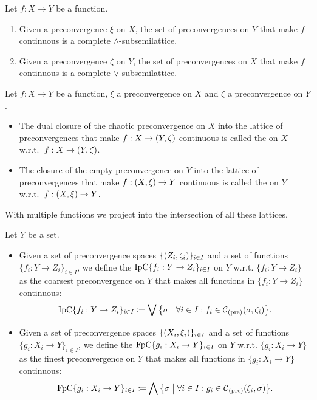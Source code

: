 \begin{corollary}
Let $f: X\to Y$ be a function.
\begin{enumerate}
\item Given a preconvergence $\xi$ on $X$, the set of preconvergences on $Y$ that make $f$ continuous is a complete $\wedge$-subsemilattice.
\item Given a preconvergence $\zeta$ on $Y$, the set of preconvergences on $X$ that make $f$ continuous is a complete $\vee$-subsemilattice.
\end{enumerate}
\end{corollary}

\begin{definition}
Let $f: X\to Y$ be a function, $\xi$ a preconvergence on $X$ and $\zeta$ a preconvergence on $Y$.
\begin{itemize}
\item The dual closure of the chaotic preconvergence on $X$ into the lattice of preconvergences that make $f:X\to \sSet{Y,\zeta}$ continuous is called the  on $X$ w.r.t.\ $f:X\to \sSet{Y,\zeta}$.
\item The closure of the empty preconvergence on $Y$ into the lattice of preconvergences that make $f:\sSet{X,\xi}\to Y$ continuous is called the  on $Y$ w.r.t.\ $f:\sSet{X,\xi}\to Y$.
\end{itemize}
\end{definition}

With multiple functions we project into the intersection of all these lattices.

\begin{definition}
Let $Y$ be a set.
\begin{itemize}
\item Given a set of preconvergence spaces $\{\sSet{Z_i,\zeta_i}\}_{i\in I}$ and a set of functions $\{f_i: Y\to Z_i\}_{i\in I}$, we define the  $\operatorname{IpC}\{f_i: Y\to Z_i\}_{i\in I}$ on $Y$ w.r.t. $\{f_i: Y\to Z_i\}$ as the coarsest preconvergence on $Y$ that makes all functions in $\{f_i: Y\to Z_i\}$ continuous:
\[ \initialPreConv\{f_i: Y\to Z_i\}_{i\in I} \defeq \bigvee \setbuilder{\sigma}{\forall i\in I: f_i\in  \cont_\text{(pre)}(\sigma, \zeta_i)}. \]
\item Given a set of preconvergence spaces $\{\sSet{X_i,\xi_i}\}_{i\in I}$ and a set of functions $\{g_i: X_i \to Y\}_{i\in I}$, we define the  $\operatorname{FpC}\{g_i: X_i \to Y\}_{i\in I}$ on $Y$ w.r.t. $\{g_i: X_i\to Y\}$ as the finest preconvergence on $Y$ that makes all functions in $\{g_i: X_i \to Y\}$ continuous:
\[ \finalPreConv\{g_i: X_i \to Y\}_{i\in I} \defeq \bigwedge \setbuilder{\sigma}{\forall i\in I: g_i\in  \cont_\text{(pre)}(\xi_i, \sigma)}. \]
\end{itemize}
\end{definition}

